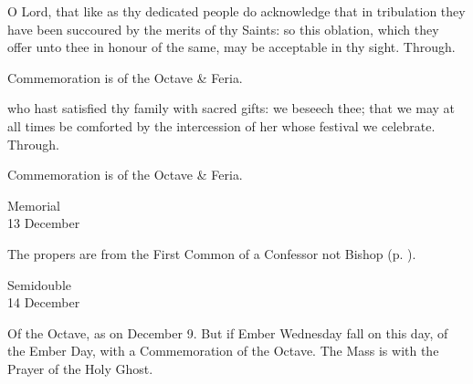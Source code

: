 
\secret
{} O Lord, that like as thy dedicated people do acknowledge that in tribulation they have been succoured by the merits of thy Saints: so this oblation, which they offer unto thee in honour of the same, may be acceptable in thy sight. Through.

\begin{rubric}
	Commemoration is of the Octave \& Feria.
\end{rubric}


\postcommunion
{} who hast satisfied thy family with sacred gifts: we beseech thee; that we may at all times be comforted by the intercession of her whose festival we celebrate. Through.

\begin{rubric}
	Commemoration is of the Octave \& Feria.
\end{rubric}

\begin{inhead}
    {Memorial\\
13 December}
\end{inhead}

\begin{rubric}
	The propers are from the First Common of a Confessor not Bishop (p. \pageref{CommonConfessorNotBishopI}).
\end{rubric}


\begin{inhead}
    {Semidouble\\
14 December}
\end{inhead}

\begin{rubric}
	Of the Octave, as on December 9. But if Ember Wednesday fall on this day, of the Ember Day, with a Commemoration of the Octave. The Mass is with the  Prayer of the Holy Ghost.
\end{rubric}

